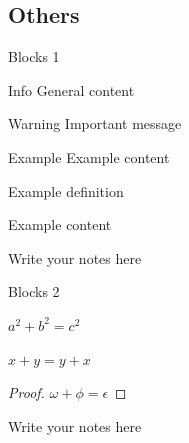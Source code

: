 \documentclass[aspectratio=169]{beamer}
\begin{document}
    \subsection{Others}
        \begin{frame}{Blocks 1}
            \begin{block}{Info}
                General content
            \end{block}

            \begin{alertblock}{Warning}
                Important message
            \end{alertblock}

            \begin{exampleblock}{Example}
                Example content
            \end{exampleblock}

            \begin{definition}
                Example definition
            \end{definition}

            \begin{example}
                Example content
            \end{example}

            \begin{note}
                {Write your notes here}
            \end{note}
        \end{frame}

        \begin{frame}{Blocks 2}
            \begin{theorem}[Pythagoras] 
                $a^2 + b^2 = c^2$
            \end{theorem}

            \begin{corollary}
                $x + y = y + x$
            \end{corollary}

            \begin{proof}
                $\omega + \phi = \epsilon$
            \end{proof}

            \begin{note}
                {Write your notes here}
            \end{note}
        \end{frame}
\end{document}
